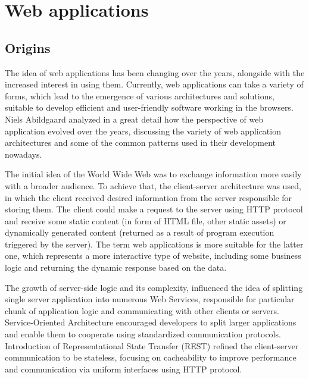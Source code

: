 \chapter{Web applications} \label{chapter:web-apps}


\section{Origins}

The idea of web applications has been changing over the years, alongside with the increased interest in using them. Currently, web applications can take a variety of forms, which lead to the emergence of various architectures and solutions, suitable to develop efficient and user-friendly software working in the browsers. Niels Abildgaard \cite{PerspectivesOnArchitectureEvolution} analyzed in a great detail how the perspective of web application evolved over the years, discussing the variety of web application architectures and some of the common patterns used in their development nowadays.

The initial idea of the World Wide Web was to exchange information more easily with a broader audience. To achieve that, the client-server architecture was used, in which the client received desired information from the server responsible for storing them. The client could make a request to the server using HTTP protocol and receive some static content (in form of HTML file, other static assets) or dynamically generated content (returned as a result of program execution triggered by the server). The term web applications is more suitable for the latter one, which represents a more interactive type of website, including some business logic and returning the dynamic response based on the data.

The growth of server-side logic and its complexity, influenced the idea of splitting single server application into numerous Web Services, responsible for particular chunk of application logic and communicating with other clients or servers. Service-Oriented Architecture encouraged developers to split larger applications and enable them to cooperate using standardized communication protocols. Introduction of Representational State Transfer (REST) \cite{RESTPrincipledDesingOfModernWebArchitecture} refined the client-server communication to be stateless, focusing on cacheability to improve performance and communication via uniform  interfaces using HTTP protocol.


